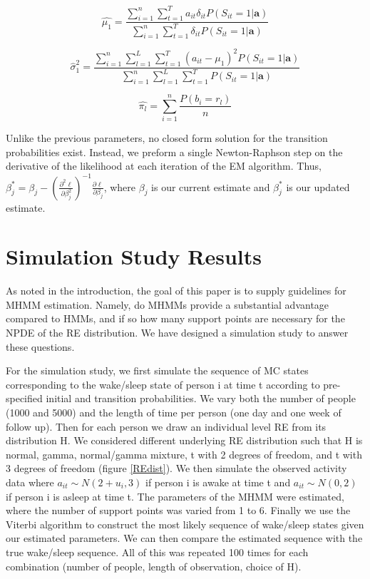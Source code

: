 \documentclass{article}
\begin{document}
\begin{equation}\label{mu1}
    \hat{\mu_1} = 
    \frac{\sum_{i=1}^n \sum_{t=1}^T a_{it}\delta_{it}P(S_{it}=1|\textbf{a})}
        {\sum_{i=1}^n \sum_{t=1}^T \delta_{it}P(S_{it}=1|\textbf{a})}
\end{equation} 

\begin{equation}\label{sig1}
    \hat{\sigma}_1^2 = 
    \frac{\sum_{i=1}^n \sum_{l=1}^L \sum_{t=1}^T 
        (a_{it}-\mu_1)^2 P(S_{it}=1|\textbf{a})}
        {\sum_{i=1}^n \sum_{l=1}^L \sum_{t=1}^T P(S_{it}=1|\textbf{a})}
\end{equation} 

\begin{equation}\label{pi}
    \hat{\pi_l} = \sum_{i = 1}^n \frac{P(b_i = r_l)}{n}
\end{equation}


Unlike the previous parameters, no closed form solution for 
the transition probabilities exist. Instead, we preform a 
single Newton-Raphson step on the derivative of the likelihood 
at each iteration of the EM algorithm. Thus, 
$\beta_{j}^* = \beta_{j} - (\frac{\partial^2\ell}{\partial \beta_{j}^2})^{-1}
\frac{\partial\ell}{\partial \beta_{j}}$, where $\beta_{j}$ is 
our current estimate and $\beta_{j}^*$ is our updated estimate. 

\section{Simulation Study Results}

As noted in the introduction, the goal of this paper is to 
supply guidelines for MHMM estimation. Namely, do MHMMs provide 
a substantial advantage compared to HMMs, and if so how many 
support points are necessary for the NPDE of the RE distribution. 
We have designed a simulation study to answer these questions.

For the simulation study, we first simulate the sequence of MC 
states corresponding to the wake/sleep state of person i at time 
t according to pre-specified initial and transition probabilities. 
We vary both the number of people (1000 and 5000) and the length 
of time per person (one day and one week of follow up). Then for 
each person we draw an individual level RE from its distribution H. 
We considered different underlying RE distribution such that H is 
normal, gamma, normal/gamma mixture, t with 2 degrees of freedom, 
and t with 3 degrees of freedom (figure \ref{REdist}). We then 
simulate the observed activity data where $a_{it} \sim N(2+u_i,3)$ 
if person i is awake at time t and $a_{it} \sim N(0,2)$ if person i 
is asleep at time t. The parameters of the MHMM were estimated, where 
the number of support points was varied from 1 to 6. Finally we use 
the Viterbi algorithm to construct the most likely sequence of 
wake/sleep states given our estimated parameters. We can then compare 
the estimated sequence with the true wake/sleep sequence. All of this 
was repeated 100 times for each combination (number of people, length 
of observation, choice of H).
\end{document}
